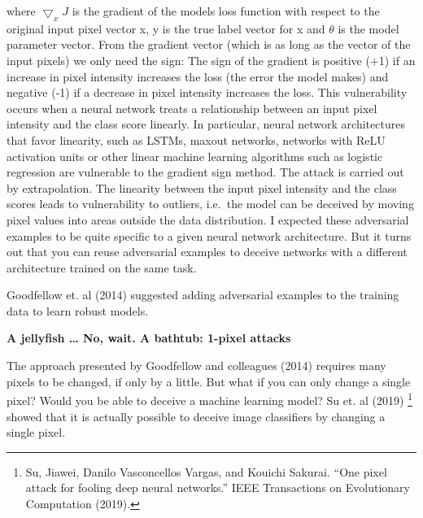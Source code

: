 \documentclass[12pt,]{krantz}
\begin{document}
where \(\bigtriangledown_x{}J\) is the gradient of the models loss
function with respect to the original input pixel vector x, y is the
true label vector for x and \(\theta\) is the model parameter vector.
From the gradient vector (which is as long as the vector of the input
pixels) we only need the sign: The sign of the gradient is positive (+1)
if an increase in pixel intensity increases the loss (the error the
model makes) and negative (-1) if a decrease in pixel intensity
increases the loss. This vulnerability occurs when a neural network
treats a relationship between an input pixel intensity and the class
score linearly. In particular, neural network architectures that favor
linearity, such as LSTMs, maxout networks, networks with ReLU activation
units or other linear machine learning algorithms such as logistic
regression are vulnerable to the gradient sign method. The attack is
carried out by extrapolation. The linearity between the input pixel
intensity and the class scores leads to vulnerability to outliers,
i.e.~the model can be deceived by moving pixel values into areas outside
the data distribution. I expected these adversarial examples to be quite
specific to a given neural network architecture. But it turns out that
you can reuse adversarial examples to deceive networks with a different
architecture trained on the same task.

Goodfellow et. al (2014) suggested adding adversarial examples to the
training data to learn robust models.

\textbf{A jellyfish \ldots{} No, wait. A bathtub: 1-pixel attacks}

The approach presented by Goodfellow and colleagues (2014) requires many
pixels to be changed, if only by a little. But what if you can only
change a single pixel? Would you be able to deceive a machine learning
model? Su et. al (2019) \footnote{Su, Jiawei, Danilo Vasconcellos
  Vargas, and Kouichi Sakurai. ``One pixel attack for fooling deep
  neural networks.'' IEEE Transactions on Evolutionary Computation
  (2019).} showed that it is actually possible to deceive image
classifiers by changing a single pixel.
\end{document}

